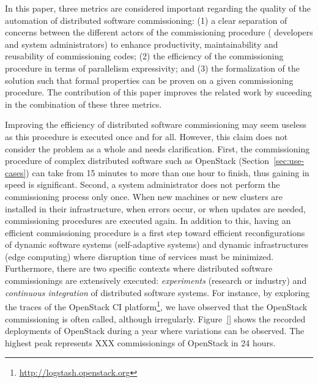 
In this paper, three metrics are considered important regarding the quality of
the automation of distributed software commissioning: (1) a clear separation of
concerns between the different actors of the commissioning procedure (\ie
developers and system administrators) to enhance productivity, maintainability
and reusability of commissioning codes; (2) the efficiency of the commissioning
procedure in terms of parallelism expressivity; and (3) the formalization of
the solution such that formal properties can be proven on a given
commissioning procedure. The contribution of this paper improves the related
work by suceeding in the combination of these three metrics.

Improving the efficiency of distributed software commissioning may seem useless
as this procedure is executed once and for all. However, this claim does not
consider the problem as a whole and needs clarification. %
First, the commissioning procedure of complex distributed software such as
OpenStack (Section~\ref{sec:use-cases}) can take from 15 minutes to more than
one hour to finish, thus gaining in speed is significant. Second, a system
administrator does not perform the commissioning process only once. When new
machines or new clusters are installed in their infrastructure, when errors
occur, or when updates are needed, commissioning procedures are executed again.
In addition to this, having an efficient commissioning procedure is a first step
toward efficient reconfigurations of dynamic software systems (\eg self-adaptive
systems) and dynamic infrastructures (\eg edge computing) where disruption time
of services must be minimized. %
Furthermore, there are two specific contexts where distributed software
commissionings are extensively executed: \emph{experiments} (research or
industry) and \emph{continuous integration} of distributed software systems. For
instance, by exploring the traces of the OpenStack CI
platform\footnote{\url{http://logstash.openstack.org}}, we have observed that
the OpenStack commissioning is often called, although irregularly. Figure~\ref{}
shows the recorded deployments of OpenStack during a year where variations can
be observed. The highest peak represents XXX commissionings of OpenStack in 24
hours. %

